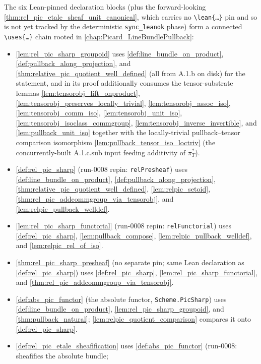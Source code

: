 The six Lean-pinned declaration blocks (plus the forward-looking
\cref{thm:rel_pic_etale_sheaf_unit_canonical}, which carries no
\texttt{\textbackslash lean\{\dots\}} pin and so is not yet tracked by
the deterministic \texttt{sync\_leanok} phase) form a connected
\texttt{\textbackslash uses\{\dots\}} chain rooted in
\cref{chap:Picard_LineBundlePullback}:
\begin{itemize}
  \item \cref{lem:rel_pic_sharp_groupoid} uses
    \cref{def:line_bundle_on_product}, \cref{def:pullback_along_projection}, and
    \cref{thm:relative_pic_quotient_well_defined} (all from A.1.b on disk) for the
    statement, and in its proof additionally consumes the tensor-substrate
    lemmas \cref{lem:tensorobj_lift_onproduct},
    \cref{lem:tensorobj_preserves_locally_trivial}, \cref{lem:tensorobj_assoc_iso},
    \cref{lem:tensorobj_comm_iso}, \cref{lem:tensorobj_unit_iso},
    \cref{lem:tensorobj_isoclass_commgroup}, \cref{lem:tensorobj_inverse_invertible},
    and \cref{lem:pullback_unit_iso} together with the locally-trivial pullback--tensor
    comparison isomorphism \cref{lem:pullback_tensor_iso_loctriv} (the
    concurrently-built A.1.c.sub input feeding additivity of \(\pi_T^*\)).
  \item \cref{def:rel_pic_sharp} (run-0008 repin: \texttt{relPresheaf})
    uses
    \cref{def:line_bundle_on_product}, \cref{def:pullback_along_projection},
    \cref{thm:relative_pic_quotient_well_defined}, \cref{lem:relpic_setoid},
    \cref{thm:rel_pic_addcommgroup_via_tensorobj}, and
    \cref{lem:relpic_pullback_welldef}.
  \item \cref{lem:rel_pic_sharp_functorial} (run-0008 repin:
    \texttt{relFunctorial}) uses
    \cref{def:rel_pic_sharp}, \cref{lem:pullback_compose},
    \cref{lem:relpic_pullback_welldef}, and \cref{lem:relpic_rel_of_iso}.
  \item \cref{thm:rel_pic_sharp_presheaf} (no separate pin; same Lean
    declaration as \cref{def:rel_pic_sharp}) uses
    \cref{def:rel_pic_sharp}, \cref{lem:rel_pic_sharp_functorial}, and
    \cref{thm:rel_pic_addcommgroup_via_tensorobj}.
  \item \cref{def:abs_pic_functor} (the absolute functor,
    \texttt{Scheme.PicSharp}) uses
    \cref{def:line_bundle_on_product}, \cref{lem:rel_pic_sharp_groupoid}, and
    \cref{thm:pullback_natural}; \cref{lem:relpic_quotient_comparison} compares
    it onto \cref{def:rel_pic_sharp}.
  \item \cref{def:rel_pic_etale_sheafification} uses
    \cref{def:abs_pic_functor} (run-0008: sheafifies the absolute bundle;

\end{itemize}
